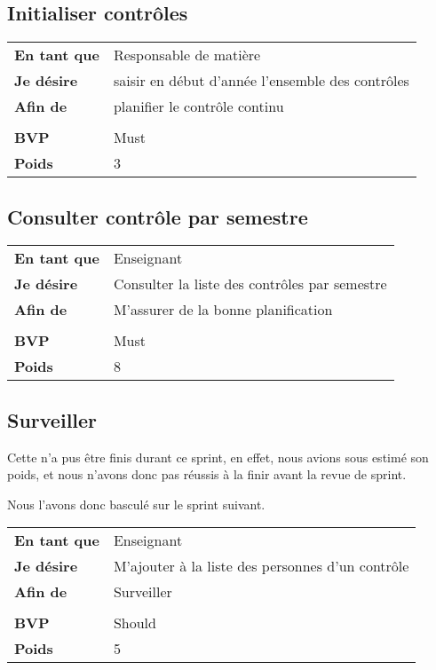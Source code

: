 \subsection{Initialiser contrôles}
\begin{tabular}{ll}
	\textbf{En tant que}	&	Responsable de matière\\
	\textbf{Je désire}&	saisir en début d'année l'ensemble des contrôles\\
	\textbf{Afin de}	& planifier le contrôle continu	\\
	&\\
	\textbf{BVP} & Must\\
	\textbf{Poids} & 3\\
\end{tabular}

\subsection{Consulter contrôle par semestre}
\begin{tabular}{ll}
	\textbf{En tant que}	&	Enseignant \\
	\textbf{Je désire}&	Consulter la liste des contrôles par semestre\\
	\textbf{Afin de}	&	M'assurer de la bonne planification\\
	&\\
	\textbf{BVP} & Must\\
	\textbf{Poids} & 8\\
\end{tabular}

\subsection{Surveiller}\label{USsurveiller}
Cette \US{} n'a pus être finis durant ce sprint, en effet, nous avions sous estimé son poids, et nous
n'avons donc pas réussis à la finir avant la revue de sprint.

Nous l'avons donc basculé sur le sprint suivant.

\begin{tabular}{ll}
	\textbf{En tant que}	&	Enseignant \\
	\textbf{Je désire}&	M'ajouter à la liste des personnes d'un contrôle\\
	\textbf{Afin de}	& Surveiller\\
	&\\
	\textbf{BVP} & Should\\
	\textbf{Poids} & 5\\
\end{tabular}

